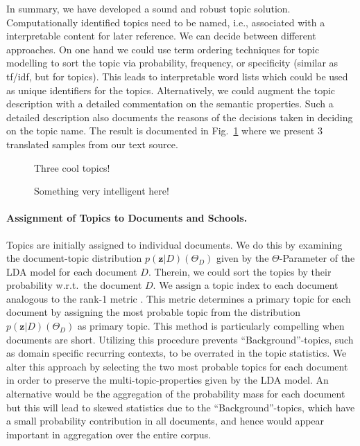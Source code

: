 \documentclass[a4paper,10pt]{article}
\newcommand{\TODO}[1]{\begingroup\color{red}#1\endgroup}
\newcommand{\PFS}[1]{\begingroup\color{blue}#1\endgroup}
\begin{document}
\PFS{In summary, we have developed a sound and robust topic solution.
  Computationally identified topics need to be named, i.e., associated with
  a interpretable content for later reference.}  We can decide between
different approaches. On one hand we could use term ordering techniques for
topic modelling to sort the topic via probability, frequency, or
specificity (similar as tf/idf, but for topics). This leads to
interpretable word lists which could be used as unique identifiers for the
topics. Alternatively, we could augment the topic description with a
detailed commentation on the semantic properties. \PFS{Such a detailed
  description also documents the reasons of the decisions taken in deciding
  on the topic name.} The result is documented in Fig.~\ref{fig:topixampl}
where we present 3 translated samples from our text source.

\begin{figure}
  \begin{center} 
    \TODO{Three cool topics!} 
  \end{center}
  \caption{Something very intelligent here!}
  \label{fig:topixampl}
\end{figure}

\paragraph{Assignment of Topics to Documents and Schools.} 

\PFS{Topics are initially assigned to individual documents.} We do this by
examining the document-topic distribution $p(\mathbf{z}|D) (\Theta_D)$
given by the $\Theta$-Parameter of the LDA model for each document
$D$. Therein, we could sort the topics by their probability w.r.t.\ the
document $D$. We assign a topic index to each document analogous to the
rank-1 metric \cite{evans:2014}. This metric determines a primary topic for
each document by assigning the most probable topic from the distribution
$p(\mathbf{z}|D) (\Theta_D)$ as primary topic.  This method is particularly
compelling when documents are short. Utilizing this procedure prevents
``Background''-topics, such as domain specific recurring contexts, to be
overrated in the topic statistics. We alter this approach by selecting the
two most probable topics for each document in order to preserve the
multi-topic-properties given by the LDA model. An alternative would be the
aggregation of the probability mass for each document but this will lead to
skewed statistics due to the ``Background''-topics, which have a small
probability contribution in all documents, \PFS{and hence would appear
  important in aggregation over the entire corpus.}
\end{document}
